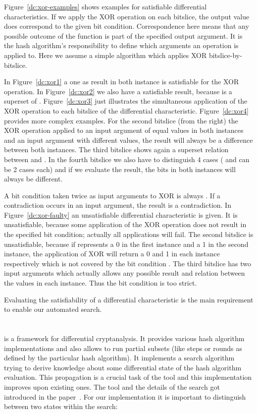 %
Figure~\ref{dc:xor-examples} shows examples for satisfiable differential characteristics. If we apply the XOR operation on each bitslice, the output value does correspond to the given bit condition. Correspondence here means that any possible outcome of the function is part of the specified output argument. It is the hash algorithm's responsibility to define which arguments an operation is applied to. Here we assume a simple algorithm which applies XOR bitslice-by-bitslice.

In Figure~\ref{dc:xor1} a one as result in both instance is satisfiable for the XOR operation. In Figure~\ref{dc:xor2} we also have a satisfiable result, because  is a superset of . Figure~\ref{dc:xor3} just illustrates the simultaneous application of the XOR operation to each bitslice of the differential characteristic. Figure~\ref{dc:xor4} provides more complex examples. For the second bitslice (from the right) the XOR operation applied to an input argument of equal values in both instances and an input argument with different values, the result will always be a difference between both instances. The third bitslice shows again a superset relation between  and . In the fourth bitslice we also have to distinguish 4 cases ( and  can be 2 cases each) and if we evaluate the result, the bits in both instances will always be different.

A bit condition taken twice as input arguments to XOR is always . If a contradiction occurs in an input argument, the result is a contradiction. In Figure~\ref{dc:xor-faulty} an unsatisfiable differential characteristic is given. It is unsatisfiable, because some application of the XOR operation does not result in the specified bit condition; actually all applications will fail. The second bitslice is unsatisfiable, because if  represents a 0 in the first instance and a 1 in the second instance, the application of XOR will return a 0 and 1 in each instance respectively which is not covered by the bit condition . The third bitslice has two input arguments which actually allows any possible result and relation between the values in each instance. Thus the bit condition \bc{-} is too strict.

Evaluating the satisfiability of a differential characteristic is the main requirement to enable our automated search.

\section{\nltool}
\label{sec:nltool}
%
\nltool{} is a framework for differential cryptanalysis. It provides various hash algorithm implementations and also allows to run partial subsets (like steps or rounds as defined by the particular hash algorithm). It implements a search algorithm trying to derive knowledge about some differential state of the hash algorithm evaluation. This propagation is a crucial task of the tool and this implementation improves upon existing ones. The tool and the details of the search got introduced in the paper~\cite[293]{Cry07}. For our implementation it is important to distinguish between two states within the search:

